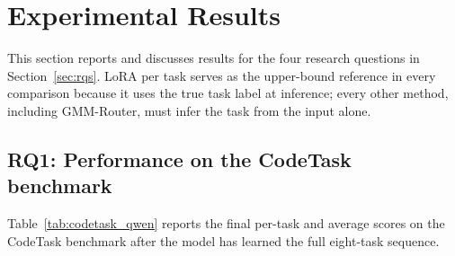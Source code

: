 \section{Experimental Results}
\label{sec:results}

This section reports and discusses results for the four research questions in Section~\ref{sec:rqs}. LoRA per task serves as the upper-bound reference in every comparison because it uses the true task label at inference; every other method, including GMM-Router, must infer the task from the input alone.

\subsection{RQ1: Performance on the CodeTask benchmark}
\label{sec:codetask_results}

Table~\ref{tab:codetask_qwen} reports the final per-task and average scores on the CodeTask benchmark after the model has learned the full eight-task sequence.

\begin{table}[t]
\centering
\caption{Final results (\%) on the CodeTask benchmark (Qwen2.5-Coder-1.5B, $\tau=2.0$). LoRA per task is the upper bound (task identity known at inference).}
\label{tab:codetask_qwen}
\scriptsize
{}
\end{table}

